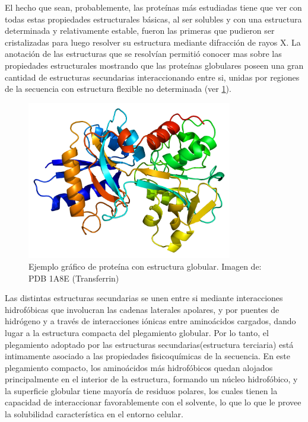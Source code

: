 El hecho que sean, probablemente, las proteínas más estudiadas tiene que ver con todas estas propiedades estructurales básicas, 
al ser solubles y con una estructura determinada y relativamente estable, fueron las primeras que pudieron ser cristalizadas para luego resolver su estructura mediante difracción de rayos X.
La anotación de las estructuras que se resolvían permitió conocer mas sobre las propiedades estructurales mostrando que las proteínas globulares poseen una gran cantidad de estructuras secundarias interaccionando entre si, 
unidas por regiones de la secuencia con estructura flexible no determinada (ver \ref{globularExample}).

\begin{figure}[h]
\centering
\includegraphics[width=0.8\textwidth]{img/transferrin.png} 
\caption{Ejemplo gráfico de proteína con estructura globular. Imagen de: PDB 1A8E (Transferrin)} 
\label{globularExample}
\end{figure}

Las distintas estructuras secundarias se unen entre si mediante interacciones hidrofóbicas que involucran las cadenas laterales apolares, y por puentes de hidrógeno y a través de interacciones iónicas entre aminoácidos cargados, dando lugar
a la estructura compacta del plegamiento globular. Por lo tanto, el plegamiento adoptado por las estructuras secundarias(estructura terciaria) está intimamente asociado a las propiedades fisicoquímicas de la secuencia. 
En este plegamiento compacto, los aminoácidos más hidrofóbicos quedan alojados principalmente en el interior de la estructura, formando un núcleo hidrofóbico, 
y la superficie globular tiene mayoría de residuos polares, los cuales tienen la capacidad de interaccionar favorablemente con el solvente, lo que lo que le provee la solubilidad característica en el entorno celular. 



